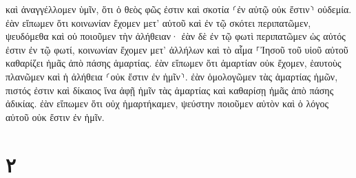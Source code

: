 \documentclass{openreader}
\begin{document}
καὶ ἀναγγέλλομεν ὑμῖν, ὅτι ὁ θεὸς φῶς ἐστιν καὶ σκοτία ⸂ἐν αὐτῷ οὐκ ἔστιν⸃ οὐδεμία. ἐὰν εἴπωμεν ὅτι κοινωνίαν ἔχομεν μετ’ αὐτοῦ καὶ ἐν τῷ σκότει περιπατῶμεν, ψευδόμεθα καὶ οὐ ποιοῦμεν τὴν ἀλήθειαν· ἐὰν δὲ ἐν τῷ φωτὶ περιπατῶμεν ὡς αὐτός ἐστιν ἐν τῷ φωτί, κοινωνίαν ἔχομεν μετ’ ἀλλήλων καὶ τὸ αἷμα ⸀Ἰησοῦ τοῦ υἱοῦ αὐτοῦ καθαρίζει ἡμᾶς ἀπὸ πάσης ἁμαρτίας. ἐὰν εἴπωμεν ὅτι ἁμαρτίαν οὐκ ἔχομεν, ἑαυτοὺς πλανῶμεν καὶ ἡ ἀλήθεια ⸂οὐκ ἔστιν ἐν ἡμῖν⸃. ἐὰν ὁμολογῶμεν τὰς ἁμαρτίας ἡμῶν, πιστός ἐστιν καὶ δίκαιος ἵνα ἀφῇ ἡμῖν τὰς ἁμαρτίας καὶ καθαρίσῃ ἡμᾶς ἀπὸ πάσης ἀδικίας. ἐὰν εἴπωμεν ὅτι οὐχ ἡμαρτήκαμεν, ψεύστην ποιοῦμεν αὐτὸν καὶ ὁ λόγος αὐτοῦ οὐκ ἔστιν ἐν ἡμῖν. \section*{۲}
\end{document}
